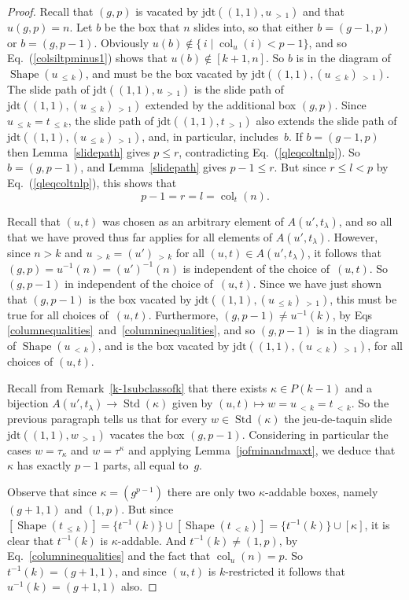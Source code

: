\documentclass[10pt]{amsart}
\theoremstyle{definition}
\DeclareMathOperator{\col}{col}
\newcommand{\lessthan}[2]{#1\,{_{<\,#2}}}
\newcommand{\morethan}[2]{#1\,{_{>\,#2}}}
\newcommand{\Lessthan}[2]{#1\,{_{\leqslant\,#2}}}
\newcommand{\jdt}{\mathrm{jdt}}
\DeclareMathOperator{\STD}{Std}
\DeclareMathOperator{\shape}{Shape}
\begin{document}
\begin{proof}
Recall that $(g,p)$ is vacated by $\jdt((1,1),\morethan u1)$ and that $u(g,p)=n$.
Let $b$ be the box that $n$ slides into, so that either $b=(g-1,p)$ or
$b=(g,p-1)$. Obviously $u(b)\notin\{\,i\mid\col_u(i)<p-1\}$, and so
Eq.~(\ref{colsiltpminus1}) shows that $u(b)\notin[k+1,n]$. So $b$
is in the diagram of $\shape(\Lessthan uk)$, and must be the box vacated by
$\jdt((1,1),\morethan{(\Lessthan uk)}1)$. The slide path of
$\jdt((1,1),\morethan u1)$ is the slide path of
$\jdt((1,1),\morethan{(\Lessthan uk)}1)$ extended by the additional box $(g,p)$.
Since $\Lessthan uk=\Lessthan tk$, the slide path of $\jdt((1,1),\morethan t1)$
also extends the slide path of $\jdt((1,1),\morethan{(\Lessthan uk)}1)$, and,
in particular, includes~$b$. If $b=(g-1,p)$ then Lemma~\ref{slidepath}
gives $p\leqslant r$, contradicting Eq.~(\ref{qleqcoltnlp}). So $b=(g,p-1)$,
and Lemma~\ref{slidepath} gives $p-1\leqslant r$.
But since $r\leqslant l<p$ by Eq.~(\ref{qleqcoltnlp}),
this shows that
\begin{equation}\label{columnequalities}
p-1=r=l=\col_t(n).
\end{equation}

Recall that $(u,t)$ was chosen as an arbitrary element of $A(u',t_\lambda)$, and so
all that we have proved thus far applies for all elements of $A(u',t_\lambda)$.
However, since $n>k$ and $\morethan uk=\morethan{(u')}k$ for all
$(u,t)\in A(u',t_\lambda)$, it follows that $(g,p)=u^{-1}(n)=(u')^{-1}(n)$
is independent of the choice of~$(u,t)$. So $(g,p-1)$ in independent of the
choice of~$(u,t)$. Since we have just shown that $(g,p-1)$ is the box vacated
by $\jdt((1,1),\morethan{(\Lessthan uk)}1)$, this must be true for all choices
of~$(u,t)$. Furthermore, $(g,p-1)\ne u^{-1}(k)$, by Eqs
\eqref{columnequalities}~and~\eqref{columninequalities}, and so $(g,p-1)$ is in the
diagram of $\shape(\lessthan uk)$, and is the box vacated by
$\jdt((1,1),\morethan{(\lessthan uk)}1)$, for all choices of $(u,t)$.

Recall from Remark~\ref{k-1subclassofk} that there exists $\kappa\in P(k-1)$
and a bijection $A(u',t_\lambda)\to\STD(\kappa)$ given by
$(u,t)\mapsto w=\lessthan uk=\lessthan tk$. So the previous paragraph
tells us that for every $w\in\STD(\kappa)$ the jeu-de-taquin slide
$\jdt((1,1),\morethan w1)$ vacates the box $(g,p-1)$. Considering in particular
the cases $w=\tau_\kappa$ and $w=\tau^\kappa$ and applying Lemma~\ref{jofminandmaxt},
we deduce that $\kappa$ has exactly $p-1$ parts, all equal to~$g$.

Observe that since $\kappa=(g^{p-1})$ there are only two $\kappa$-addable boxes,
namely $(g+1,1)$ and $(1,p)$. But since
$[\shape(\Lessthan tk)]=\{t^{-1}(k)\}\cup[\shape(\lessthan tk)]=\{t^{-1}(k)\}\cup[\kappa]$,
it is clear that $t^{-1}(k)$ is $\kappa$-addable. And $t^{-1}(k)\ne(1,p)$, by
Eq.~\eqref{columninequalities} and the fact that $\col_u(n)=p$. So $t^{-1}(k)=(g+1,1)$,
and since $(u,t)$ is $k$-restricted it follows that $u^{-1}(k)=(g+1,1)$ also.


\end{proof}
\end{document}
